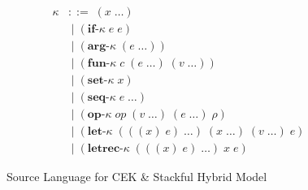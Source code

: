 \begin{figure}[!htbp]
\begin{align*}
        \kappa &::=\; (x\;\ldots)\\
               &\;|\; (\textbf{if-}\kappa\; e\; e)\\
               &\;|\; (\textbf{arg-}\kappa\; (e\;\ldots))\\
               &\;|\; (\textbf{fun-}\kappa\; c\; (e\;\ldots)\; (v\;\ldots))\\
               &\;|\; (\textbf{set-}\kappa\; x)\\
               &\;|\; (\textbf{seq-}\kappa\; e\;\ldots)\\
               &\;|\; (\textbf{op-}\kappa\; \textit{op}\; (v\;\ldots)\; (e\;\ldots)\; \rho)\\
               &\;|\; (\textbf{let-}\kappa\; (((x)\; e)\;\ldots)\; (x\;\ldots)\; (v\;\ldots)\; e)\\
               &\;|\; (\textbf{letrec-}\kappa\; (((x)\; e)\;\ldots)\; x\; e)
    \end{align*}

    \vspace{-1em}

    \caption{Source Language for CEK \& Stackful Hybrid Model}
    \label{fig:st-cek-grammar}
\end{figure}
